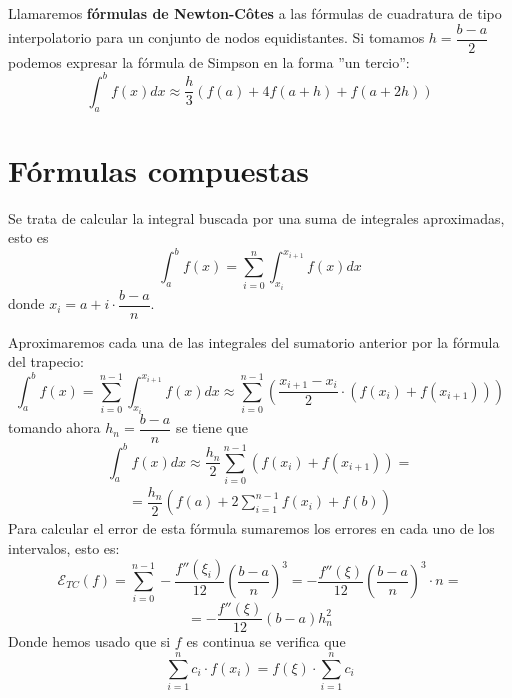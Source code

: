 \begin{obs}
Llamaremos \textbf{fórmulas de Newton-Côtes} a las fórmulas de cuadratura de tipo interpolatorio para un conjunto de nodos equidistantes. Si tomamos $h=\dfrac{b-a}{2}$ podemos expresar la fórmula de Simpson en la forma ''un tercio'':
$$\int_a^{b}f(x)dx\approx \dfrac{h}{3}(f(a)+4f\left(a+h\right)+f(a+2h))$$
\end{obs}

 \section{Fórmulas compuestas}

 \begin{obs}
Se trata de calcular la integral buscada por una suma de integrales aproximadas, esto es
$$\int_a^bf(x)=\sum_{i=0}^n\int_{x_i}^{x_{i+1}}f(x)dx$$
donde $x_i=a+i\cdot \dfrac{b-a}{n}$. 
 \end{obs}
 \begin{ejem} Aproximaremos cada una de las integrales del sumatorio anterior por la fórmula del trapecio:
$$\int_a^bf(x)=\sum_{i=0}^{n-1}\int_{x_i}^{x_{i+1}}f(x)dx\approx\sum_{i=0}^{n-1}\left(\dfrac{x_{i+1}-x_i}{2}\cdot(f(x_i)+f(x_{i+1}))\right)$$
tomando ahora $h_n=\dfrac{b-a}{n}$ se tiene que
 $$\int_a^bf(x)dx\approx\dfrac{h_n}{2}\sum_{i=0}^{n-1}(f(x_i)+f(x_{i+1}))=$$
 \begin{align}
  =\dfrac{h_n}{2}\left(f(a)+2\sum_{i=1}^{n-1}f(x_i)+f(b)\right)
  \label{trp:comp}
 \end{align}
 Para calcular el error de esta fórmula sumaremos los errores en cada uno de los intervalos, esto es:
 $$\mathcal{E}_{TC}(f)=\sum_{i=0}^{n-1}-\dfrac{f''(\xi_i)}{12}\left(\dfrac{b-a}{n}\right)^3=-\dfrac{f''(\xi)}{12}\left(\dfrac{b-a}{n}\right)^3\cdot n=$$
 $$=-\dfrac{f''(\xi)}{12}(b-a)h_n^2$$
 Donde hemos usado que si $f $ es continua se verifica que
 $$\sum_{i=1}^nc_i\cdot f(x_i)=f(\xi)\cdot \sum_{i=1}^nc_i$$
 \end{ejem}


